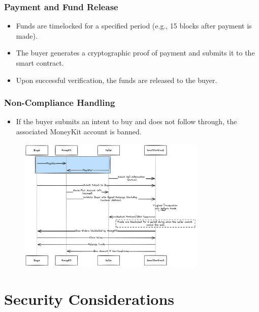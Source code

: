 \documentclass[11pt,oneside,a4paper]{article}
\begin{document}
\subsubsection{Payment and Fund Release}

\begin{itemize}
    \item Funds are timelocked for a specified period (e.g., 15 blocks after payment is made).
    \item The buyer generates a cryptographic proof of payment and submits it to the smart contract.
    \item Upon successful verification, the funds are released to the buyer.
\end{itemize}

\subsubsection{Non-Compliance Handling}

\begin{itemize}
    \item If the buyer submits an intent to buy and does not follow through, the associated MoneyKit account is banned.
\end{itemize}

\begin{figure}[h]
\centering
\includegraphics[width=0.8\textwidth]{img/money_kit.png}
\end{figure}

\section{Security Considerations}
\end{document}
